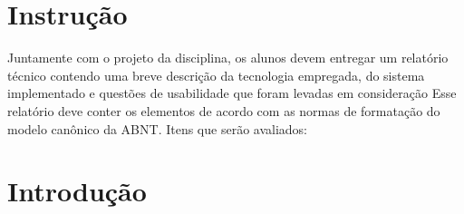 \documentclass[
	12pt,				%
	oneside,   	        %
	a4paper,			%
	english,			%
	french,				%
	spanish,			%
	brazil,				%
	]{pacotes/abntex2}
\begin{document}
\frenchspacing 



\imprimirfolhaderosto





\tableofcontents*
\cleardoublepage

\textual

\makeatletter
\renewcommand{\chapter}{\@gobbletwo}
\makeatother
\section{Instrução}
Juntamente com o projeto da disciplina, os alunos devem entregar um relatório técnico
contendo uma breve descrição da tecnologia empregada, do sistema implementado e
questões de usabilidade que foram levadas em consideração
Esse relatório deve conter os elementos de acordo com as normas de formatação do modelo
canônico da ABNT.
Itens que serão avaliados:
\section{Introdução} 
\end{document}
